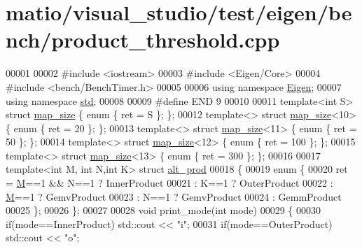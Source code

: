 \hypertarget{matio_2visual__studio_2test_2eigen_2bench_2product__threshold_8cpp_source}{}\section{matio/visual\+\_\+studio/test/eigen/bench/product\+\_\+threshold.cpp}
\label{matio_2visual__studio_2test_2eigen_2bench_2product__threshold_8cpp_source}

\begin{DoxyCode}
00001 
00002 \textcolor{preprocessor}{#include <iostream>}
00003 \textcolor{preprocessor}{#include <Eigen/Core>}
00004 \textcolor{preprocessor}{#include <bench/BenchTimer.h>}
00005 
00006 \textcolor{keyword}{using namespace }\hyperlink{namespace_eigen}{Eigen};
00007 \textcolor{keyword}{using namespace }\hyperlink{namespacestd}{std};
00008 
00009 \textcolor{preprocessor}{#define END 9}
00010 
00011 \textcolor{keyword}{template}<\textcolor{keywordtype}{int} S> \textcolor{keyword}{struct }\hyperlink{structmap__size}{map\_size} \{ \textcolor{keyword}{enum} \{ ret = S \}; \};
00012 \textcolor{keyword}{template}<>  \textcolor{keyword}{struct }\hyperlink{structmap__size}{map\_size}<10> \{ \textcolor{keyword}{enum} \{ ret = 20 \}; \};
00013 \textcolor{keyword}{template}<>  \textcolor{keyword}{struct }\hyperlink{structmap__size}{map\_size}<11> \{ \textcolor{keyword}{enum} \{ ret = 50 \}; \};
00014 \textcolor{keyword}{template}<>  \textcolor{keyword}{struct }\hyperlink{structmap__size}{map\_size}<12> \{ \textcolor{keyword}{enum} \{ ret = 100 \}; \};
00015 \textcolor{keyword}{template}<>  \textcolor{keyword}{struct }\hyperlink{structmap__size}{map\_size}<13> \{ \textcolor{keyword}{enum} \{ ret = 300 \}; \};
00016 
00017 \textcolor{keyword}{template}<\textcolor{keywordtype}{int} M, \textcolor{keywordtype}{int} N,\textcolor{keywordtype}{int} K> \textcolor{keyword}{struct }\hyperlink{structalt__prod}{alt\_prod}
00018 \{
00019   \textcolor{keyword}{enum} \{
00020     ret = \hyperlink{group___core___module_class_eigen_1_1_matrix}{M}==1 && N==1 ? InnerProduct
00021         : K==1 ? OuterProduct
00022         : \hyperlink{group___core___module_class_eigen_1_1_matrix}{M}==1 ? GemvProduct
00023         : N==1 ? GemvProduct
00024         : GemmProduct
00025   \};
00026 \};
00027         
00028 \textcolor{keywordtype}{void} print\_mode(\textcolor{keywordtype}{int} mode)
00029 \{
00030   \textcolor{keywordflow}{if}(mode==InnerProduct) std::cout << \textcolor{stringliteral}{"i"};
00031   \textcolor{keywordflow}{if}(mode==OuterProduct) std::cout << \textcolor{stringliteral}{"o"};

\end{DoxyCode}
